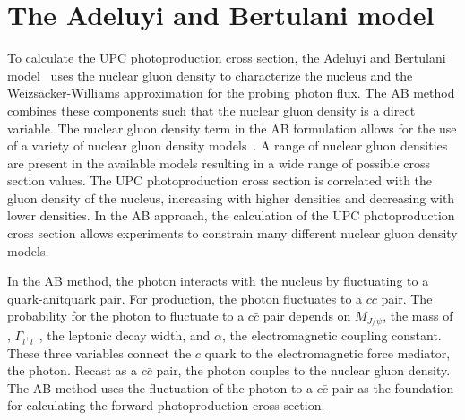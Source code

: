   \section{The Adeluyi and Bertulani model \label{sec:pQCDapp}}
    To calculate the UPC \JPsi{} photoproduction cross section, the Adeluyi 
      and Bertulani model~\cite{pQCD2011.08,pQCD2013.02,Pumplin:2002vw,Martin:2009iq} uses the nuclear gluon density to characterize the 
      nucleus and the Weizs\"{a}cker-Williams approximation for the probing 
      photon flux. 
    The AB method combines these components such that the nuclear gluon 
      density is a direct variable.
    The nuclear gluon density term in the AB formulation allows for 
      the use of a variety of nuclear gluon density models~\cite{Eskola:2008ca,Eskola:2009uj}.
    A range of nuclear gluon densities are present in the available models
      resulting in a wide range of possible cross section values. 
    The UPC \JPsi{} photoproduction cross section is correlated with the gluon
      density of the nucleus, increasing with higher densities and decreasing 
      with lower densities. 
    In the AB approach, the calculation of the UPC \JPsi{} photoproduction 
      cross section allows experiments to constrain many different nuclear 
      gluon density models. 
    
    In the AB method, the photon interacts with the nucleus by fluctuating to 
      a quark-anitquark pair.
    For \JPsi{} production, the photon fluctuates to a $c\bar{c}$ pair. 
    The probability for the photon to fluctuate to a $c\bar{c}$ pair
      depends on $M_{J/\psi}$, the mass of \JPsi{}, $\Gamma_{l^{+}l^{-}}$, 
      the \JPsi{} leptonic decay width, and $\alpha$, the electromagnetic 
      coupling constant.
    These three variables connect the $c$ quark to the electromagnetic force 
      mediator, the photon. 
    Recast as a $c\bar{c}$ pair, the photon couples to the nuclear gluon 
      density.
    The AB method uses the fluctuation of the photon to a $c\bar{c}$ 
      pair as the foundation for calculating the forward \JPsi{} 
      photoproduction cross section. 

